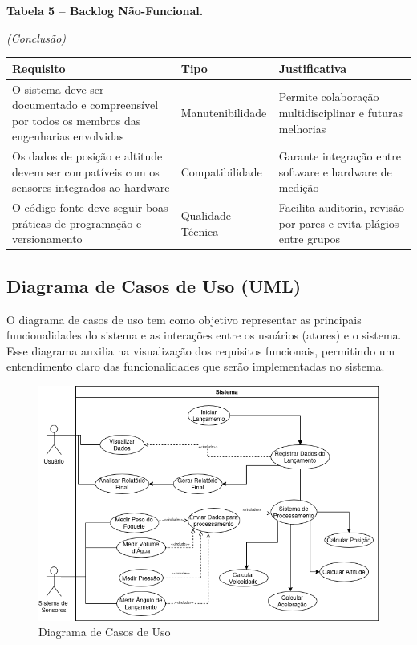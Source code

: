 \begin{table}[H]
    \centerline{\textbf{Tabela 5 – Backlog Não-Funcional.}}
    \hfill\textit{(Conclusão)}
    
    \vspace{0.1cm}
    \centering
    \begin{tabular}{|p{5cm}|p{3cm}|p{6cm}|}
        \hline
        \textbf{Requisito} & \textbf{Tipo} & \textbf{Justificativa} \\
        \hline    
        O sistema deve ser documentado e compreensível por todos os membros das engenharias envolvidas & Manutenibilidade & Permite colaboração multidisciplinar e futuras melhorias \\
        \hline
        Os dados de posição e altitude devem ser compatíveis com os sensores integrados ao hardware & Compatibilidade & Garante integração entre software e hardware de medição \\
        \hline
        O código-fonte deve seguir boas práticas de programação e versionamento & Qualidade Técnica & Facilita auditoria, revisão por pares e evita plágios entre grupos \\
        \hline
    \end{tabular}
\end{table}

\subsection{Diagrama de Casos de Uso (UML)}

O diagrama de casos de uso tem como objetivo representar as principais funcionalidades do sistema e as interações entre os usuários (atores) e o sistema. Esse diagrama auxilia na visualização dos requisitos funcionais, permitindo um entendimento claro das funcionalidades que serão implementadas no sistema.

\begin{figure}[H]
    \centering
    \includegraphics[width=0.75\linewidth]{editaveis/figuras/DiagramaCasoUso.png}
    \caption{Diagrama de Casos de Uso}
    \label{fig:diagrama-casos-uso}
\end{figure}

